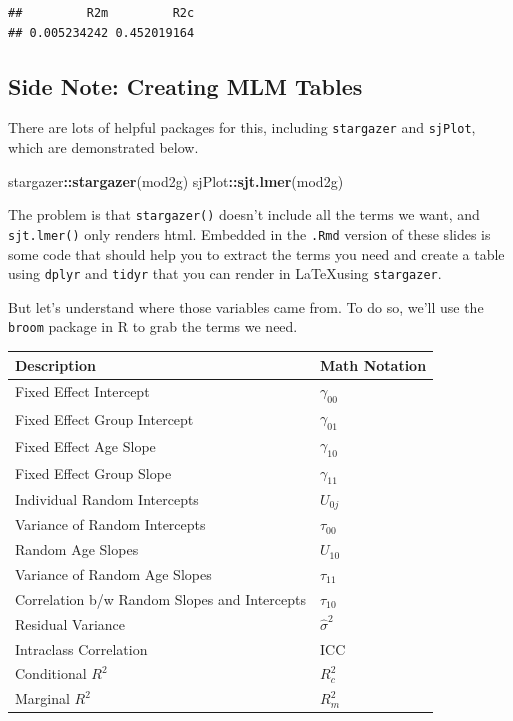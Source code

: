 \documentclass[]{article}
\newenvironment{Shaded}{\begin{snugshade}}{\end{snugshade}}
\newcommand{\KeywordTok}[1]{\textcolor[rgb]{0.13,0.29,0.53}{\textbf{#1}}}
\newcommand{\OperatorTok}[1]{\textcolor[rgb]{0.81,0.36,0.00}{\textbf{#1}}}
\newcommand{\NormalTok}[1]{#1}
\begin{document}
\begin{verbatim}
##         R2m         R2c 
## 0.005234242 0.452019164
\end{verbatim}

\normalsize

\subsection{Side Note: Creating MLM
Tables}\label{side-note-creating-mlm-tables}

There are lots of helpful packages for this, including
\texttt{stargazer} and \texttt{sjPlot}, which are demonstrated below.\\
\small

\begin{Shaded}
\begin{Highlighting}[]
\NormalTok{stargazer}\OperatorTok{::}\KeywordTok{stargazer}\NormalTok{(mod2g)}
\NormalTok{sjPlot}\OperatorTok{::}\KeywordTok{sjt.lmer}\NormalTok{(mod2g)}
\end{Highlighting}
\end{Shaded}

\normalsize

The problem is that \texttt{stargazer()} doesn't include all the terms
we want, and \texttt{sjt.lmer()} only renders html. Embedded in the
\texttt{.Rmd} version of these slides is some code that should help you
to extract the terms you need and create a table using \texttt{dplyr}
and \texttt{tidyr} that you can render in \LaTeX using
\texttt{stargazer}.

But let's understand where those variables came from. To do so, we'll
use the \texttt{broom} package in R to grab the terms we need.

\begin{longtable}[]{@{}ll@{}}
\toprule
Description & Math Notation\tabularnewline
\midrule
\endhead
Fixed Effect Intercept & \(\gamma_{00}\)\tabularnewline
Fixed Effect Group Intercept & \(\gamma_{01}\)\tabularnewline
Fixed Effect Age Slope & \(\gamma_{10}\)\tabularnewline
Fixed Effect Group Slope & \(\gamma_{11}\)\tabularnewline
Individual Random Intercepts & \(U_{0j}\)\tabularnewline
Variance of Random Intercepts & \(\tau_{00}\)\tabularnewline
Random Age Slopes & \(U_{10}\)\tabularnewline
Variance of Random Age Slopes & \(\tau_{11}\)\tabularnewline
Correlation b/w Random Slopes and Intercepts &
\(\tau_{10}\)\tabularnewline
Residual Variance & \(\hat{\sigma}^2\)\tabularnewline
Intraclass Correlation & ICC\tabularnewline
Conditional \(R^2\) & \(R^2_c\)\tabularnewline
Marginal \(R^2\) & \(R^2_m\)\tabularnewline
\bottomrule
\end{longtable}
\end{document}
